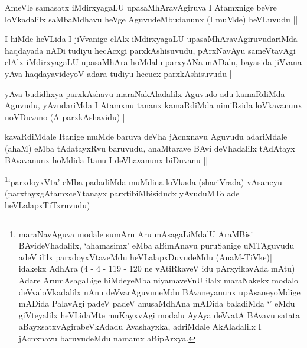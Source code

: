 \begin{artha}
AmeVle samasatx iMdirxyagaLU upasaMhAravAgiruva I Atamxnige beVre
loVkadalilx saMbaMdhavu heVge AguvudeMbudanunx (I muMde) heVLuvudu ||
\end{artha}


\begin{artha}
I hiMde heVLida I jiVvanige elAlx iMdirxyagaLU
upasaMhAravAgiruvudariMda haqdayada nADi tudiyu hecAcxgi
parxkAshisuvudu, pArxNavAyu sameVtavAgi elAlx iMdirxyagaLU upasaMhAra
hoMdalu parxyANa mADalu, bayasida jiVvana yAva haqdayavideyoV adara
tudiyu hecucx parxkAshisuvudu ||
\end{artha}


\begin{artha}
yAva budidhxya parxkAshavu maraNakAladalilx Aguvudo adu kamaRdiMda
Aguvudu, yAvudariMda I Atamxnu tananx kamaRdiMda nimiRsida loVkavanunx
noVDuvano (A parxkAshavidu) ||
\end{artha}


\begin{artha}
kavaRdiMdale Itanige muMde baruva deVha jAcnxnavu Aguvudu adariMdale
(ahaM) eMba tAdatayxRvu baruvudu, anaMtarave BAvi deVhadalilx tAdAtayx
BAvavanunx hoMdida Itanu I deVhavanunx biDuvanu ||
\end{artha}



\begin{artha}
\footnote{maraNavAguva modale sumAru Aru mAsagaLiMdalU AraMBisi
  BAvideVhadalilx, `ahamasimx' eMba aBimAnavu puruSanige uMTAguvudu
  adeV ililx parxdoyxVtaveMdu heVLalapxDuvudeMdu (AnaM-TiVke)|| idakekx
AdhAra (4 - 4 - 119 - 120 ne vAtiRkaveV idu pArxyikavAda mAtu) Adare
ArumAsagaLige hiMdeyeMba niyamaveVnU ilalx maraNakekx modalo
deVvaloVkadalilx nAnu deVvarAguvuneMdu BAvaneyanunx upAsaneyoMdige
mADida PalavAgi padeV padeV anusaMdhAna mADida baladiMda
`\stext' eMdu giVteyalilx heVLidaMte muKayxvAgi modalu AyAya deVvatA
BAvavu satata aBayxsatxvAgirabeVkAdadu Avashayxka, adriMdale
AkAladalilx I jAcnxnavu baruvudeMdu namamx aBipArxya.}`parxdoyxVta' eMba padadiMda muMdina loVkada (shariVrada) vAsaneyu
  (parxtayxgAtamxceYtanayx parxtibiMbisidudx yAvuduMTo ade heVLalapxTiTxruvudu)
\end{artha}

